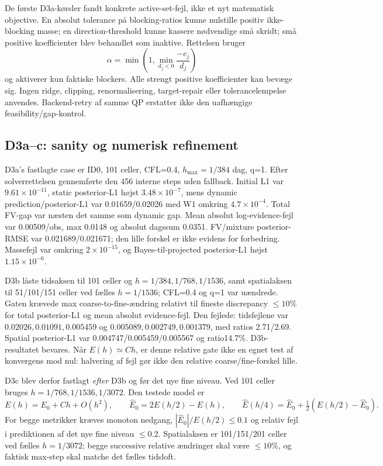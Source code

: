 De første D3a-kørsler fandt konkrete active-set-fejl, ikke et nyt matematisk objective.
En absolut tolerance på blocking-ratios kunne nulstille positiv ikke-blocking masse;
en direction-threshold kunne kassere nødvendige små skridt; små positive koefficienter
blev behandlet som inaktive. Rettelsen bruger
\[
 \alpha=\min\!\left(1,\min_{d_j<0}\frac{-c_j}{d_j}\right)
\]
og aktiverer kun faktiske blockers. Alle strengt positive koefficienter kan bevæge sig.
Ingen ridge, clipping, renormalisering, target-repair eller tolerancelempelse anvendes.
Backend-retry af samme QP erstatter ikke den uafhængige feasibility/gap-kontrol.

\subsection{D3a--c: sanity og numerisk refinement}
D3a's fastlagte case er ID0, 101 celler, CFL=0.4, \(h_{\max}=1/384\) dag, q=1.
Efter solverrettelsen gennemførte den 456 interne steps uden fallback. Initial L1 var
\(9.61\times10^{-11}\), static posterior-L1 højst \(3.48\times10^{-7}\), mens
dynamic prediction/posterior-L1 var 0.01659/0.02026 med W1 omkring
\(4.7\times10^{-4}\). Total FV-gap var næsten det samme som dynamic gap.
Mean absolut log-evidence-fejl var 0.00509/obs, max 0.0148 og absolut dagssum 0.0351.
FV/mixture posterior-RMSE var 0.021689/0.021671; den lille forskel er ikke evidens
for forbedring. Massefejl var omkring \(2\times10^{-15}\), og Bayes-til-projected
posterior-L1 højst \(1.15\times10^{-6}\).

D3b låste tidsaksen til 101 celler og \(h=1/384,1/768,1/1536\), samt spatialaksen
til 51/101/151 celler ved fælles \(h=1/1536\); CFL=0.4 og q=1 var uændrede.
Gaten krævede max coarse-to-fine-ændring relativt til fineste discrepancy \(\le10\%\)
for total posterior-L1 og mean absolut evidence-fejl. Den fejlede: tidsfejlene var
\(0.02026,0.01091,0.005459\) og \(0.005089,0.002749,0.001379\), med ratios
2.71/2.69. Spatial posterior-L1 var 0.004747/0.005459/0.005567 og ratio14.7\%.
D3b-resultatet bevares. Når \(E(h)\simeq Ch\), er denne relative gate ikke en egnet
test af konvergens mod nul: halvering af fejl gør ikke den relative coarse/fine-forskel lille.

D3c blev derfor fastlagt \emph{efter} D3b og før det nye fine niveau. Ved 101 celler
bruges \(h=1/768,1/1536,1/3072\). Den testede model er
\[
 E(h)=E_0+Ch+O(h^2),\qquad
 \widehat E_0=2E(h/2)-E(h),\qquad
 \widehat E(h/4)=\widehat E_0+\tfrac12(E(h/2)-\widehat E_0).
\]
For begge metrikker kræves monoton nedgang, \(|\widehat E_0|/E(h/2)\le0.1\) og
relativ fejl i prediktionen af det nye fine niveau \(\le0.2\).
Spatialaksen er 101/151/201 celler ved fælles \(h=1/3072\); begge successive relative
ændringer skal være \(\le10\%\), og faktisk max-step skal matche det fælles tidsloft.

